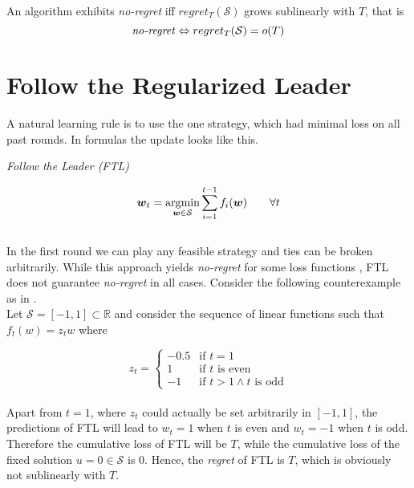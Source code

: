 \begin{definition}\label{def:noRegret}
    An algorithm exhibits \textit{no-regret} iff $regret_T(\mathcal{S})$ grows sublinearly  with $T$, that is
    \[\text{\textit{no-regret}} \Leftrightarrow regret_T(\mathcal{S}) = o(T)\]
\end{definition}

\section{Follow the Regularized Leader}\label{section:followTheRegularizedLeader}

A natural learning rule is to use the one strategy, which had minimal loss on all past rounds. In formulas the update looks like this.

\begin{center}
    \textit{Follow the Leader (FTL)}  
\end{center}
\begin{equation*}
    \boldsymbol{w}_t = \operatorname*{\arg\!\min}_{\boldsymbol{w} \in \mathcal{S}}\sum_{i=1}^{t-1}f_i(\boldsymbol{w}) \qquad \forall t  
\end{equation*} \\

In the first round we can play any feasible strategy and ties can be broken arbitrarily. While this approach yields \textit{no-regret} for some loss functions \cite[Cor. 2.2]{shalev}, FTL does not guarantee \textit{no-regret} in all cases. Consider the following counterexample as in \cite[Ex. 2.2]{shalev}. \\

Let $\mathcal{S} = [-1,1] \subset \mathbb{R}$ and consider the sequence of linear functions such that $f_t(w) = z_tw$ where

\begin{equation*}
    z_t = \begin{cases}
    -0.5 &\text{if $t = 1$}\\
    1 &\text{if $t$ is even}\\
    -1 &\text{if $t > 1 \land t$ is odd}
    \end{cases}
\end{equation*} \\

Apart from $t = 1$, where $z_t$ could actually be set arbitrarily in $[-1,1]$, the predictions of FTL will lead to $w_t = 1$ when $t$ is even and $w_t = -1$ when $t$ is odd. Therefore the cumulative loss of FTL will be $T$, while the cumulative loss of the fixed solution $u = 0 \in \mathcal{S}$ is $0$. Hence, the \textit{regret} of FTL is $T$, which is obviously not sublinearly with $T$. \\

